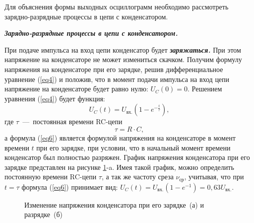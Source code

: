 \documentclass[14pt,a4paper]{article}
\begin{document}
Для объяснения формы выходных осциллограмм необходимо рассмотреть зарядно-разрядные процессы в цепи с конденсатором.

\emph{\textbf{Зарядно-разрядные процессы в цепи с конденсатором.}}

При подаче импульса на вход цепи конденсатор будет
\emph{\textbf{заряжаться.}} При этом напряжение на конденсаторе не может
измениться скачком. Получим формулу напряжения на конденсаторе при его
зарядке, решив дифференциальное уравнение (\ref{eq4}) и положив, что в момент
подачи импульса на вход цепи напряжение на конденсаторе будет равно
нулю: \(U_{C}(0) = 0\). Решением уравнения (\ref{eq4}) будет функция:
\begin{equation} \label{eq6}
  U_{C}(t) = U_\text{вх.}\left( 1 - e^{- \frac{t}{\tau}} \right),
\end{equation}
где $\tau$~---~постоянная времени RC-цепи
\[\tau = R \cdot C, \]
а формула (\ref{eq6}) является формулой напряжения на конденсаторе в момент времени $t$ при его зарядке, при условии, что в начальный момент времени конденсатор был полностью разряжен. График напряжения конденсатора при его зарядке представлен на рисунке \ref{CondenInten}-a. Имея такой график, можно
определить постоянную времени RC-цепи $\tau$, а так же частоту среза
\(\nu_\text{ср}\), учитывая, что при $t=\tau$ формула (\ref{eq6}) принимает вид:
\(U_{C}(t) = U_\text{вх.}\left( 1 - e^{- 1} \right) = 0,63U_\text{вх.}\).

\begin{figure}[htbp]
  \centering
  \caption{Изменение напряжения конденсатора при его зарядке~(а) и разрядке~(б)}
  \label{CondenInten}
\end{figure}
\end{document}
